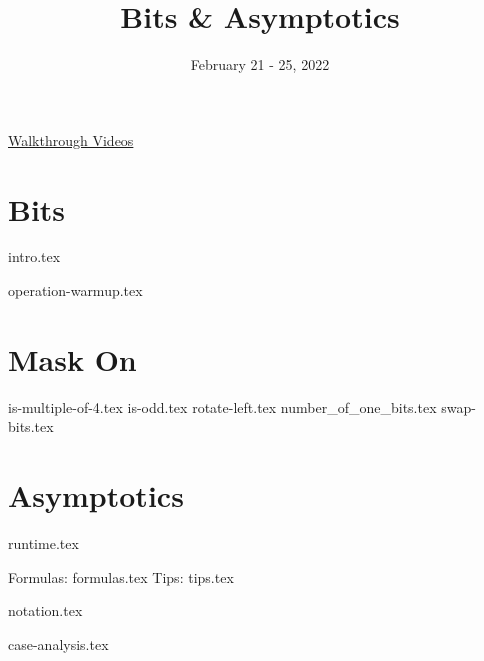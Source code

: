 \documentclass[11pt]{exam}
\title{Bits \& Asymptotics}
\date{February 21 - 25, 2022}
\begin{document}
\maketitle

\href{https://youtube.com/playlist?list=PLN303KpCz_KTrEKYh1DI2Bali7OxSZ94V}{Walkthrough Videos}

\section{Bits}
{intro.tex}

\begin{questions}
{operation-warmup.tex}
\end{questions}

\clearpage

\section{Mask On}
\begin{questions}
{is-multiple-of-4.tex}
{is-odd.tex}
{rotate-left.tex}
{number_of_one_bits.tex}
{swap-bits.tex}
\end{questions}

\clearpage

\section{Asymptotics}
\begin{questions}
{runtime.tex}

Formulas:
{formulas.tex}
Tips:
{tips.tex}

{notation.tex}

{case-analysis.tex}
\end{questions}

\clearpage
\end{document}
